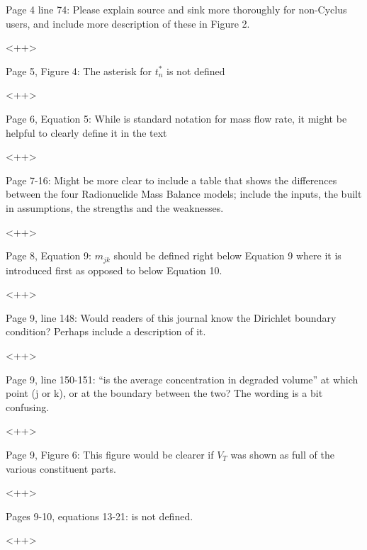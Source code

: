 \documentclass[answers,12pt]{exam}
\begin{document}
\begin{questions}
\question Page  4  line  74:  Please  explain  source  and  sink  more  thoroughly  for  non-Cyclus  users,  and include more 
description of these in Figure 2.  
\begin{solution}
<++>
\end{solution} 
 
\question Page 5, Figure 4: The asterisk for $t^*_n$ is not defined 
\begin{solution}
<++>
\end{solution} 
 
 


\question Page  6,  Equation  5: While   is standard notation for mass flow rate, it might be helpful to clearly define 
it in the text 
\begin{solution}
<++>
\end{solution} 
 
\question Page  7-16:  Might  be  more  clear  to  include  a  table  that  shows  the  differences  between  the  four 
Radionuclide  Mass  Balance  models;  include  the  inputs,  the  built  in  assumptions,  the  strengths  and  the 
weaknesses. 
\begin{solution}
<++>
\end{solution} 
 
\question Page  8,  Equation  9:  $m_{jk}$  should be defined right below Equation 9 where it is introduced first as opposed 
to below Equation 10. 
\begin{solution}
<++>
\end{solution} 
 
\question Page  9, line 148: Would readers of this journal know the Dirichlet boundary condition? Perhaps include a 
description of it. 
\begin{solution}
<++>
\end{solution} 
 
\question Page  9,  line  150-151:  ``is  the  average  concentration in degraded volume'' at which point (j or k), or at the 
boundary between the two? The wording is a bit confusing.  
\begin{solution}
<++>
\end{solution} 
 
\question Page 9, Figure 6: This figure would be clearer if $V_T$ was shown as full of the various constituent parts. 
\begin{solution}
<++>
\end{solution} 
 
\question Pages 9-10, equations 13-21:   is not defined.  
\begin{solution}
<++>
\end{solution} 
 

\end{questions}
\end{document}
